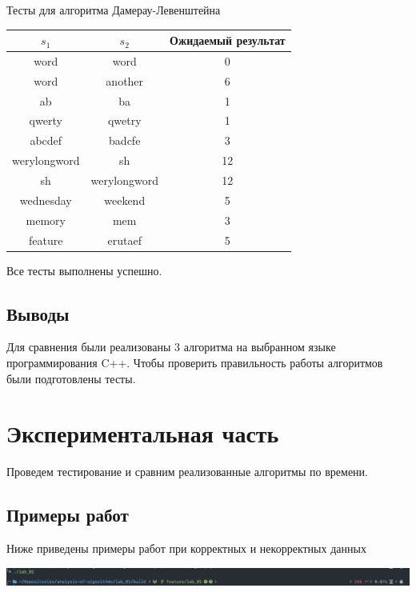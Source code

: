 \documentclass[a4paper,12pt]{article}
\begin{document}
\begin{center}
    Тесты для алгоритма Дамерау-Левенштейна

    \begin{tabular}{|c|c|c|}
        \hline
        $s_1$ & $s_2$ & Ожидаемый результат \\
        \hline
        word & word & 0 \\
        \hline
        word & another & 6 \\
        \hline
        ab & ba & 1 \\
        \hline
        qwerty & qwetry & 1 \\
        \hline
        abcdef & badcfe & 3 \\
        \hline
        werylongword & sh & 12 \\
        \hline
        sh & werylongword & 12 \\
        \hline
        wednesday & weekend & 5 \\
        \hline
        memory & mem & 3 \\
        \hline
        feature & erutaef & 5 \\
        \hline
    \end{tabular}
\end{center}

Все тесты выполнены успешно.

\subsection{Выводы}

Для сравнения были реализованы 3 алгоритма на выбранном языке
программирования C++. Чтобы проверить правильность работы алгоритмов
были подготовлены тесты.

\newpage
\section{Экспериментальная часть}

Проведем тестирование и сравним реализованные алгоритмы по времени.

\subsection{Примеры работ}

Ниже приведены примеры работ при корректных и некорректных данных

\includegraphics[scale=0.35]{zero_arg}
\end{document}
